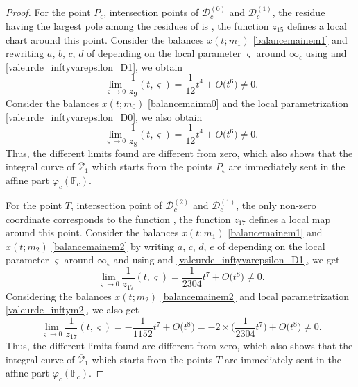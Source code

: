 \documentclass[pdftex]{sigma}
\numberwithin{equation}{section}
\begin{document}
\begin{proof}
 For the point $P_{\epsilon}$, intersection points of $\mathcal{D}_c^{(0)}$ and $\mathcal{D}_c^{(1)}$,
 the residue having the largest pole among the residues of
 is , the function $z_{15}$ defines a local chart around this point. Consider the balances $x(t;m_1)$
 \ref{balancemainem1} and rewriting $a$, $b$, $c$, $d$ of
  depending on the local parameter $\varsigma$ around $\infty_{\epsilon}$ using  and \eqref{valeurde_inftyvarepsilon_D1},
 we obtain \[\lim \limits_{\varsigma\rightarrow
 0}\frac{1}{z_9}(t,\varsigma)=\frac{1}{12}t^4+O\bigl(t^6\bigr)\neq0.\]
 Consider the balances $x(t;m_0)$
 \eqref{balancemainm0} and the local parametrization \eqref{valeurde_inftyvarepsilon_D0}, we also obtain
 \[
 \lim \limits_{\varsigma\rightarrow 0}\frac{1}{z_8}(t,\varsigma)=\frac{1 }{12}t^4+O\bigl(t^6\bigr)\neq0.
 \]
 Thus, the different limits found are different from zero, which also shows that the integral curve of $\overline{\mathcal{V}}_1$ which starts from the points $P_{\epsilon}$ are
 immediately sent in the affine part $\varphi_c(\mathbb{F}_c)$.

 For the point $T$, intersection point of $\mathcal{D}_c^{(2)}$ and $\mathcal{D}_c^{( 1)}$,
 the only non-zero coordinate corresponds to the function , the function $z_{17}$
 defines a local map around this point. Consider the balances $x(t;m_1)$ \eqref{balancemainem1}
 and $x(t;m_2)$ \eqref{balancemainem2} by writing $a$, $c$, $d$, $e$ of  depending on the local parameter $\varsigma$ around $\infty_{\epsilon}$ and
 using  and \eqref{valeurde_inftyvarepsilon_D1}, we get
 \[
 \lim \limits_{\varsigma\rightarrow 0}\frac{1}{z_{17}}(t,\varsigma)=\frac{1}{2304}t^7+O\bigl(t^8\bigr)\neq0.
 \]
 Considering the balances $x(t;m_2)$
 \eqref{balancemainem2} and local parametrization
 \eqref{valeurde_inftym2}, we also get
 \[
 \lim\limits_{\varsigma\rightarrow 0}\frac{1}{z_{17}}(t,\varsigma)=-\frac{1 }{1152}t^7+O\bigl(t^8\bigr)=-2\times\biggl(\frac{1}{2304}t^7\biggr)+O\bigl(t^8 \bigr)\neq0.
 \]
 Thus, the different limits found are different from zero,
 which also shows that the integral curve of $\overline{\mathcal{V}}_1$ which starts from the points $T$ are
 immediately sent in the affine part $\varphi_c(\mathbb{F}_c)$.


\end{proof}
\end{document}
